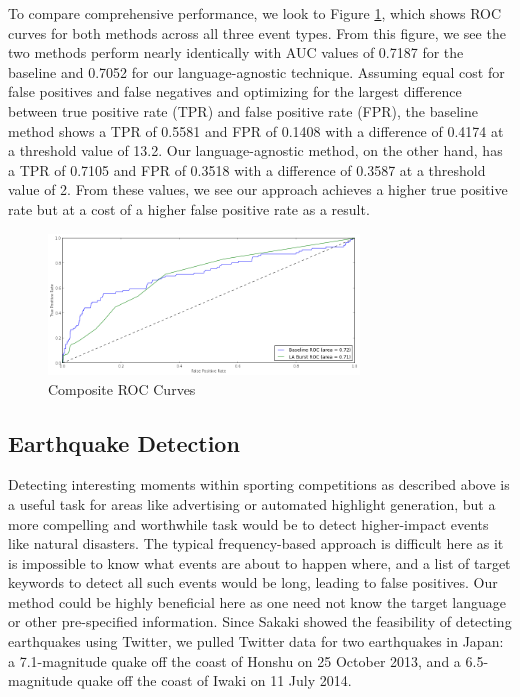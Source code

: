 \documentclass{sig-alternate}
\begin{document}
To compare comprehensive performance, we look to Figure \ref{fig:rocComprehensive}, which shows ROC curves for both methods across all three event types.
From this figure, we see the two methods perform nearly identically with AUC values of 0.7187 for the baseline and 0.7052 for our language-agnostic technique.
Assuming equal cost for false positives and false negatives and optimizing for the largest difference between true positive rate (TPR) and false positive rate (FPR), the baseline method shows a TPR of 0.5581 and FPR of 0.1408 with a difference of 0.4174 at a threshold value of 13.2.
Our language-agnostic method, on the other hand, has a TPR of 0.7105 and FPR of 0.3518 with a difference of 0.3587 at a threshold value of 2.
From these values, we see our approach achieves a higher true positive rate but at a cost of a higher false positive rate as a result.

\begin{figure}[hbtp]
\begin{center}
\includegraphics[width=3.25in]{./figures/roc_Comp.png}
\caption{Composite ROC Curves}
\label{fig:rocComprehensive}
\end{center}
\end{figure}

\subsection{Earthquake Detection}

Detecting interesting moments within sporting competitions as described above is a useful task for areas like advertising or automated highlight generation, but a more compelling and worthwhile task would be to detect higher-impact events like natural disasters.
The typical frequency-based approach is difficult here as it is impossible to know what events are about to happen where, and a list of target keywords to detect all such events would be long, leading to false positives.
Our method could be highly beneficial here as one need not know the target language or other pre-specified information.
Since Sakaki showed the feasibility of detecting earthquakes using Twitter, we pulled Twitter data for two earthquakes in Japan: a 7.1-magnitude quake off the coast of Honshu on 25 October 2013, and a 6.5-magnitude quake off the coast of Iwaki on 11 July 2014.
\end{document}
